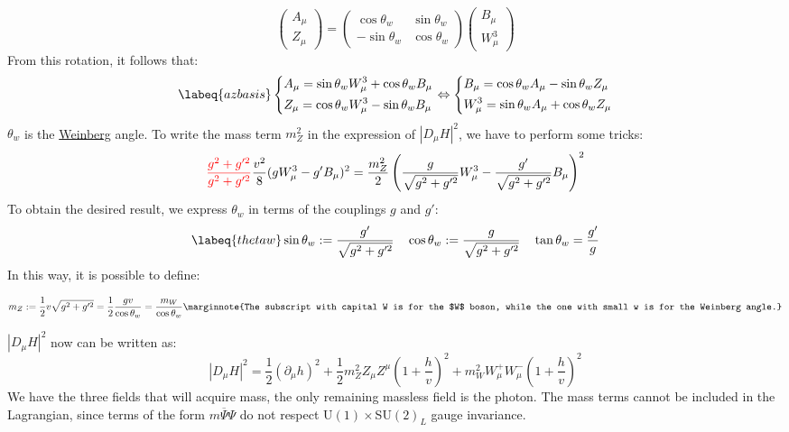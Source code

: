 \documentclass[../main.tex]{subfiles}
\begin{document}
\[
\left(\begin{array}{c}
     A_\mu \\
     Z_\mu
\end{array}\right)=\left(\begin{array}{cc}
    \cos\theta_w & \sin\theta_w \\
    -\sin\theta_w & \cos\theta_w
\end{array}\right)\left(\begin{array}{c}
     B_\mu \\
     W_\mu^3 
\end{array}\right)
\]
From this rotation, it follows that:
\begin{equation}
\labeq{azbasis}
\left\{
\begin{aligned}
&A_\mu=\sin\theta_wW_\mu^3+\cos\theta_wB_\mu\\
&Z_\mu=\cos\theta_wW_\mu^3-\sin\theta_wB_\mu
\end{aligned}
\right.
\Leftrightarrow
\left\{
\begin{aligned}
&B_\mu=\cos\theta_wA_\mu-\sin\theta_wZ_\mu\\
&W_\mu^3=\sin\theta_wA_\mu+\cos\theta_wZ_\mu
\end{aligned}
\right.
\end{equation}
$\theta_w$ is the \href{https://en.wikipedia.org/wiki/Steven_Weinberg}{Weinberg} angle. To write the mass term $m_Z^2$ in the expression of $|D_\mu H|^2$, we have to perform some tricks:
\[
{\color{red}\frac{g^2+g'^2}{g^2+g'^2}}\frac{v^2}{8}(gW_\mu^3-g'B_\mu)^2=\frac{m_Z^2}{2}\left(\frac{g}{\sqrt{g^2+g'^2}}W_\mu^3-\frac{g'}{\sqrt{g^2+g'^2}}B_\mu\right)^2
\]
To obtain the desired result, we express $\theta_w$ in terms of the couplings $g$ and $g'$:
\begin{equation}
\labeq{thetaw}  
\sin\theta_w:=\frac{g'}{\sqrt{g^2+g'^2}} \quad \cos\theta_w:=\frac{g}{\sqrt{g^2+g'^2}} \quad \tan\theta_w=\frac{g'}{g}
\end{equation}
In this way, it is possible to define:
\begin{kaobox}[frametitle=Mass of the $Z$ boson]
\[
m_Z:=\frac{1}{2}v\sqrt{g^2+g'^2}=\frac{1}{2}\frac{gv}{\cos\theta_w}=\frac{m_W}{\cos\theta_w}\marginnote{The subscript with capital W is for the $W$ boson, while the one with small w is for the Weinberg angle.}
\]    
\end{kaobox}
$|D_\mu H|^2$ now can be written as:
\[
|D_\mu H|^2=\frac{1}{2}(\partial_\mu h)^2+\frac{1}{2}m_Z^2Z_\mu Z^\mu\left(1+\frac{h}{v}\right)^2+m_W^2W_\mu^+W_\mu^-\left(1+\frac{h}{v}\right)^2
\]
We have the three fields that will acquire mass, the only remaining massless field is the photon. The mass terms cannot be included in the Lagrangian, since terms of the form $m\overline{\Psi}\Psi$ do not respect U$(1)\times$SU$(2)_L$ gauge invariance.\\
\end{document}
